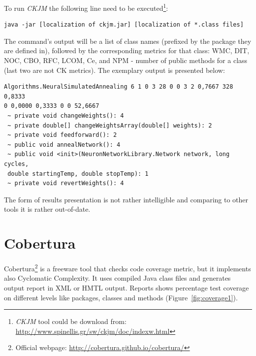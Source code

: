 To run \textit{CKJM} the following line need to be executed\footnote{\textit{CKJM} tool could be download from: \url{http://www.spinellis.gr/sw/ckjm/doc/indexw.html}}:

\begin{verbatim} 
java -jar [localization of ckjm.jar] [localization of *.class files] 
\end{verbatim} 

The command's output will be a list of class names (prefixed by the package they are defined in), followed by the corresponding metrics for that class: \ac{WMC}, \ac{DIT}, \ac{NOC}, \ac{CBO}, \ac{RFC}, \ac{LCOM}, \ac{Ce}, and NPM - number of public methods for a class (last two are not \ac{CK metrics}). The exemplary output is presented below:

\begin{verbatim} 
Algorithms.NeuralSimulatedAnnealing 6 1 0 3 28 0 0 3 2 0,7667 328 0,8333 
0 0,0000 0,3333 0 0 52,6667
 ~ private void changeWeights(): 4
 ~ private double[] changeWeightsArray(double[] weights): 2
 ~ private void feedforward(): 2
 ~ public void annealNetwork(): 4
 ~ public void <init>(NeuronNetworkLibrary.Network network, long cycles, 
 double startingTemp, double stopTemp): 1
 ~ private void revertWeights(): 4
\end{verbatim} 

The form of results presentation is not rather intelligible and comparing to other tools it is rather out-of-date.  


\section{Cobertura}
Cobertura\footnote{Official webpage: \url{http://cobertura.github.io/cobertura/}} is a freeware tool that checks code coverage metric, but it implements also Cyclomatic Complexity.  It uses compiled Java class files and generates output report in XML or HMTL output. Reports shows percentage test coverage on different levels like packages, classes and methods (Figure~\ref{fig:coverage1}). 


